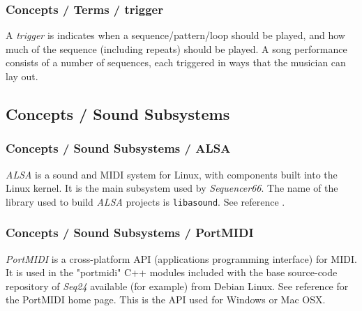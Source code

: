 \subsubsection{Concepts / Terms / trigger}
\label{subsubsec:concepts_terms_trigger}

   A \textsl{trigger} is indicates when a sequence/pattern/loop
   should be played, and how much of the sequence (including repeats) should be
   played.  A song performance consists of a number of sequences, each
   triggered in ways that the musician can lay out.

\subsection{Concepts / Sound Subsystems}
\label{subsec:concepts_sound_subsystems}

\subsubsection{Concepts / Sound Subsystems / ALSA}
\label{subsubsec:concepts_sound_alsa}

   \textsl{ALSA} is a sound and MIDI system for Linux, with components built
   into the Linux kernel. It is the main subsystem used by
   \textsl{Sequencer66}.  The name of the library used to build
   \textsl{ALSA} projects is \texttt{libasound}.
   See reference \cite{alsa}.

\subsubsection{Concepts / Sound Subsystems / PortMIDI}
\label{subsubsec:concepts_sound_portmidi}

   \textsl{PortMIDI} is a cross-platform API (applications programming
   interface) for MIDI.  It is used in the "portmidi" C++ modules
   included with the base source-code repository of \textsl{Seq24} available
   (for example) from Debian Linux.  See reference \cite{portmidi}
   for the PortMIDI home page.
   This is the API used for Windows or Mac OSX.


